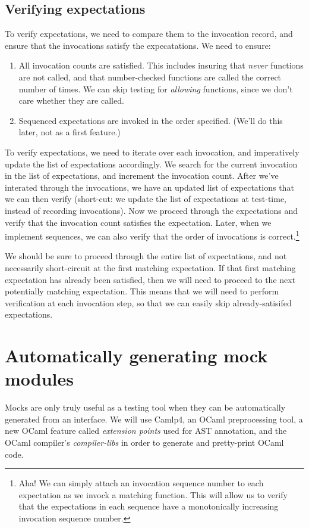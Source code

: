 
\subsection{Verifying expectations}

To verify expectations, we need to compare them to the invocation
record, and ensure that the invocations satisfy the expecatations. We
need to ensure:

\begin{enumerate}
\item All invocation counts are satisfied. This includes insuring that
  \textit{never} functions are not called, and that number-checked
  functions are called the correct number of times. We can skip
  testing for \textit{allowing} functions, since we don't care whether
  they are called.
\item Sequenced expectations are invoked in the order
  specified. (We'll do this later, not as a first feature.)
\end{enumerate}

To verify expectations, we need to iterate over each invocation, and
imperatively update the list of expectations accordingly. We search
for the current invocation in the list of expectations, and increment
the invocation count. After we've interated through the invocations,
we have an updated list of expectations that we can then verify
(short-cut: we update the list of expectations at test-time, instead
of recording invocations). Now we proceed through the expectations and
verify that the invocation count satisfies the expectation. Later,
when we implement sequences, we can also verify that the order of
invocations is correct.\footnote{Aha! We can simply attach an
  invocation sequence number to each expectation as we invock a
  matching function. This will allow us to verify that the
  expectations in each sequence have a monotonically increasing
  invocation sequence number.}

We should be sure to proceed through the entire list of expectations,
and not necessarily short-circuit at the first matching
expectation. If that first matching expectation has already been
satisfied, then we will need to proceed to the next potentially
matching expectation. This means that we will need to perform
verification at each invocation step, so that we can easily skip
already-satisifed expectations.

\section{Automatically generating mock modules}
\label{application:generation}

Mocks are only truly useful as a testing tool when they can be
automatically generated from an interface. We will use Camlp4, an
OCaml preprocessing tool, a new OCaml feature called \textit{extension
  points} used for AST annotation, and the OCaml compiler's
\textit{compiler-libs} in order to generate and pretty-print OCaml
code.
